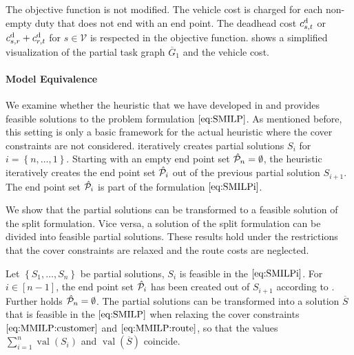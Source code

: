 The objective function is not modified. The vehicle cost is charged for each non-empty duty that does not end with an end point. The deadhead cost $c^{\operatorname{d}}_{s,t}$ or $c^{\operatorname{d}}_{s,r} + c^{\operatorname{d}}_{r,t}$ for ${s\in\mathcal{V}}$ is respected in the objective function.  shows a simplified visualization of the partial task graph $\overline{G}_1$ and the vehicle cost.

\paragraph{Model Equivalence} \parfill

We examine whether the heuristic that we have developed in  and  provides feasible solutions to the problem formulation $\eqref{eq:SMILP}$. As mentioned before, this setting is only a basic framework for the actual heuristic where the cover constraints are not considered.  iteratively creates partial solutions $S_i$ for ${i=\left\{n,\dots,1\right\}}$. Starting with an empty end point set ${\hat{\mathcal{P}}_n=\emptyset}$, the heuristic iteratively creates the end point set $\hat{\mathcal{P}}_i$ out of the previous partial solution $S_{i+1}$. The end point set $\hat{\mathcal{P}}_i$ is part of the formulation $\eqref{eq:SMILPi}$.

We show that the partial solutions can be transformed to a feasible solution of the split formulation. Vice versa, a solution of the split formulation can be divided into feasible partial solutions. These results hold under the restrictions that the cover constraints are relaxed and the route costs are neglected.

\begin{theorem}
\label{thm:equivalence_heuristic_SMILP}

Let ${\left\{S_1,\dots,S_n\right\}}$ be partial solutions, \ie $S_i$ is feasible in the $\eqref{eq:SMILPi}$. For ${i\in[n-1]}$, the end point set $\hat{\mathcal{P}}_i$ has been created out of $S_{i+1}$ according to . Further holds ${\hat{\mathcal{P}}_n=\emptyset}$. The partial solutions can be transformed into a solution $\overline{S}$ that is feasible in the $\eqref{eq:SMILP}$ when relaxing the cover constraints $\eqref{eq:MMILP:customer}$ and $\eqref{eq:MMILP:route}$, so that the values ${\sum_{i=1}^n \operatorname{val}\left(S_i\right)}$ and ${\operatorname{val}(\overline{S})}$ coincide.

\end{theorem}

